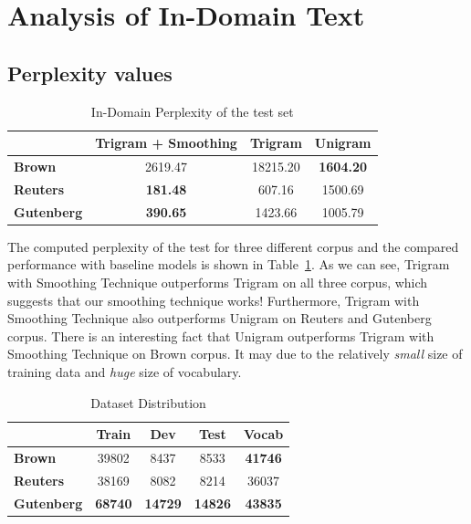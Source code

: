 \section{\textbf{Analysis of In-Domain Text}}

\subsection{\textbf{Perplexity values}}

\begin{table}[ht]  %
\centering  %
\caption{In-Domain Perplexity of the test set}
\begin{tabular}{lccc}
\hline
&    \textbf{Trigram + Smoothing} & \textbf{Trigram} & \textbf{Unigram} \\
\hline
 \textbf{Brown}   & 2619.47 &  18215.20 &  \textbf{1604.20}   \\
 \textbf{Reuters} &  \textbf{181.48} &  607.16  &  1500.69   \\
 \textbf{Gutenberg} & \textbf{390.65} & 1423.66 &  1005.79   \\
\hline
\end{tabular}
\label{tab:in-domain}
\end{table}

The computed perplexity of the test for three different corpus and the compared performance with baseline models is shown in Table~\ref{tab:in-domain}. As we can see, Trigram with Smoothing Technique outperforms Trigram on all three corpus, which suggests that our smoothing technique works! Furthermore, Trigram with Smoothing Technique also outperforms Unigram on Reuters and Gutenberg corpus. There is an interesting fact that Unigram outperforms Trigram with Smoothing Technique on Brown corpus. It may due to the relatively \textit{small} size of training data and \textit{huge} size of vocabulary. 

\begin{table}[ht]  %
\centering  %
\caption{Dataset Distribution}
\begin{tabular}{lcccc}
\hline
&    \textbf{Train} & \textbf{Dev} & \textbf{Test} & \textbf{Vocab} \\
\hline
 \textbf{Brown}   & 39802 &  8437 & 8533 & \textbf{41746}   \\
 \textbf{Reuters} &  38169 &  8082  &  8214 & 36037   \\
 \textbf{Gutenberg} & \textbf{68740} & \textbf{14729} &  \textbf{14826} & \textbf{43835} \\
\hline
\end{tabular}
\label{tab:data_dis}
\end{table}

